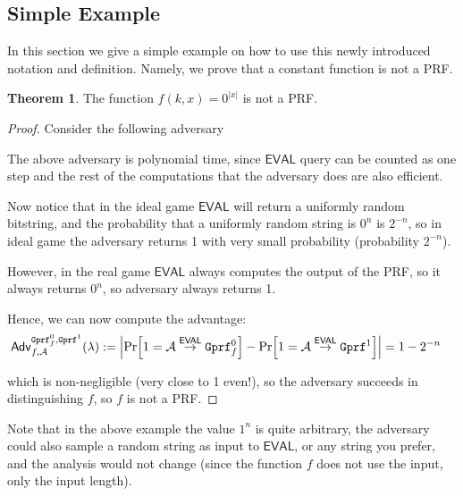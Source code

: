 \documentclass[a4paper,table,dvipsnames]{article}
\theoremstyle{definition}
\newtheorem*{theorem}{Theorem}
\newcommand{\M}[1]{\ensuremath{\text{\texttt{#1}}}}
\renewcommand{\O}[1]{\ensuremath{\mathsf{#1}}}
\begin{document}
\subsection{Simple Example}
In this section we give a simple example on how to use this newly introduced notation and definition. Namely, we prove that a constant function is not a PRF.
\begin{theorem}
	 The function $f(k,x) = 0^{|x|}$
  is not a PRF.
\end{theorem}
\begin{proof}
	Consider the following adversary
\begin{center}
    \begin{pchstack}
    \procedure{$\mathcal{A}()$}{
y \leftarrow \O{EVAL}(1^n)\\
\pcif y = 0^n\\
\pcind \pcreturn 1\\
\pcelse\\
\pcind \pcreturn 0
}    \end{pchstack}
\end{center}
 The above adversary is polynomial time, since $\O{EVAL}$ query can be counted as one step and the rest of the computations that the adversary does are also efficient.

Now notice that in the ideal game $\O{EVAL}$ will return a uniformly random bitstring, and the probability that a uniformly random string is $0^n$
  is $2^{-n}$, so in ideal game the adversary returns 1 with very small probability (probability $2^{-n}$).
  

However, in the real game $\O{EVAL}$ always computes the output of the PRF, so it always returns $0^n$, so adversary always returns 1.

Hence, we can now compute the advantage:
\begin{align*}
&\mathsf{Adv}^{\M{Gprf}_f^0,\M{Gprf}^1}_{f,\adv}(\lambda):=
\abs{\prob{1=\adv\stackrel{\O{EVAL}}{\rightarrow}\M{Gprf}^0_f}-\prob{1=\adv\stackrel{\O{EVAL}}{\rightarrow}\M{Gprf}^1}} 
= 1 - 2^{-n}
\end{align*}
 
which is non-negligible (very close to 1 even!), so the adversary succeeds in distinguishing $f$, so $f$ is not a PRF. 
\end{proof}
Note that in the above example the value $1^n$
  is quite arbitrary, the adversary could also sample a random string as input to $\O{EVAL}$, or any string you prefer, and the analysis would not change (since the function $f$ does not use the input, only the input length).
\end{document}

